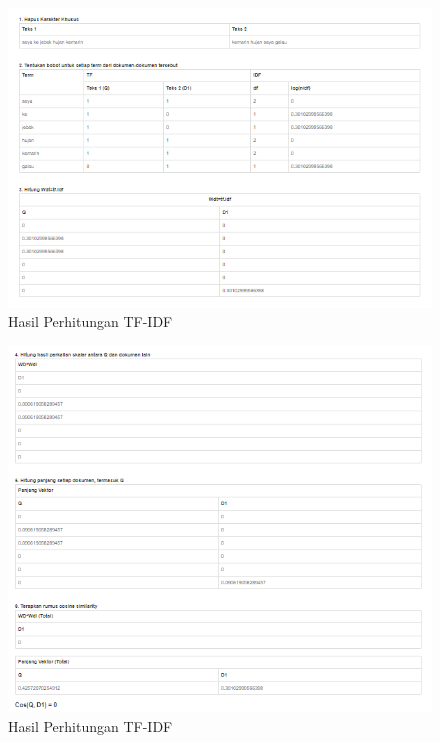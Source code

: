 \begin{figure}
      \centerline{\includegraphics[width=1\textwidth]
      {figures/cokro/c60}}
      \caption{Hasil Perhitungan TF-IDF}
      \label{c60}
      \end{figure}

\begin{figure}
      \centerline{\includegraphics[width=1\textwidth]
      {figures/cokro/c61}}
      \caption{Hasil Perhitungan  TF-IDF}
      \label{c61}
      \end{figure}

